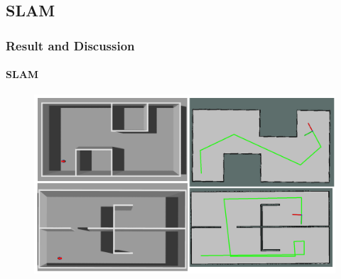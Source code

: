 %		
%		




\begin{frame}
	\subsection{SLAM}
	\frametitle{Result and Discussion}
	\framesubtitle{SLAM}
	\begin{figure}
		\includegraphics[scale=0.26]{image/slam_re}
	\end{figure}
\end{frame}


